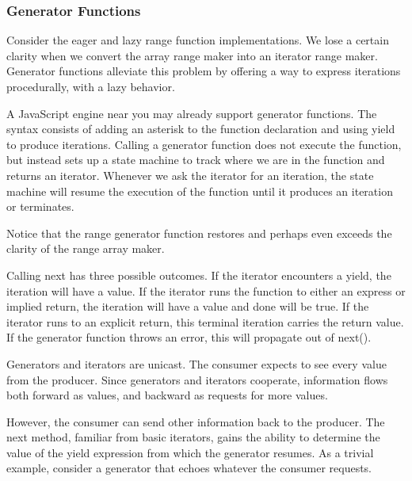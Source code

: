 \subsubsection{Generator Functions}

Consider the eager and lazy range function implementations. We lose a certain clarity when we convert the array range maker into an iterator range maker. Generator functions alleviate this problem by offering a way to express iterations procedurally, with a lazy behavior.

A JavaScript engine near you may already support generator functions. The syntax consists of adding an asterisk to the function declaration and using yield to produce iterations. Calling a generator function does not execute the function, but instead sets up a state machine to track where we are in the function and returns an iterator. Whenever we ask the iterator for an iteration, the state machine will resume the execution of the function until it produces an iteration or terminates.



Notice that the range generator function restores and perhaps even exceeds the clarity of the range array maker.

Calling next has three possible outcomes. If the iterator encounters a yield, the iteration will have a value. If the iterator runs the function to either an express or implied return, the iteration will have a value and done will be true. If the iterator runs to an explicit return, this terminal iteration carries the return value. If the generator function throws an error, this will propagate out of next().

Generators and iterators are unicast. The consumer expects to see every value from the producer. Since generators and iterators cooperate, information flows both forward as values, and backward as requests for more values.

However, the consumer can send other information back to the producer. The next method, familiar from basic iterators, gains the ability to determine the value of the yield expression from which the generator resumes. As a trivial example, consider a generator that echoes whatever the consumer requests.

